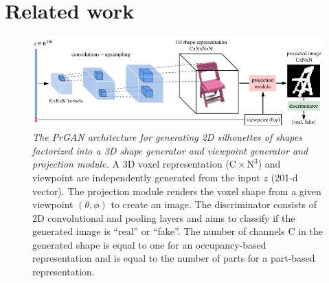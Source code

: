 \section{Related work}\label{s:related}
\begin{figure}
\centering
\includegraphics[width=\linewidth]{fig/prgan-arch-fix.pdf}
\caption{\label{fig:prgan-arch} \emph{The PrGAN architecture for generating
  2D silhouettes of shapes factorized into a 3D shape generator and
  viewpoint generator and projection module.} A 3D voxel representation ($\text{C}
  \times \text{N}^3$) and
  viewpoint are independently generated from the input $z$ (201-d
  vector). The projection module renders the voxel shape from a given
  viewpoint $(\theta,\phi)$ to create an image. The discriminator
  consists of 2D convolutional and pooling layers and aims to classify
  if the generated image is ``real'' or ``fake''. The number of
  channels C in the generated shape is equal to one for an
  occupancy-based representation and is equal to the number of parts
  for a part-based representation.}

\end{figure}


